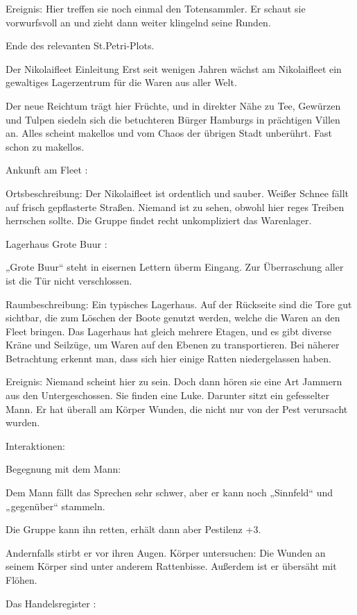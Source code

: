 Ereignis: Hier treffen sie noch einmal den Totensammler. Er schaut sie vorwurfsvoll an und zieht dann weiter klingelnd seine Runden.


Ende des relevanten St.Petri-Plots.

Der Nikolaifleet
Einleitung
Erst seit wenigen Jahren wächst am Nikolaifleet ein gewaltiges Lagerzentrum für die Waren aus aller Welt.

Der neue Reichtum trägt hier Früchte, und in direkter Nähe zu Tee, Gewürzen und Tulpen siedeln sich die betuchteren Bürger Hamburgs in prächtigen Villen an. Alles scheint makellos und vom Chaos der übrigen Stadt unberührt. Fast schon zu makellos.

Ankunft am Fleet
:

Ortsbeschreibung: Der Nikolaifleet ist ordentlich und sauber. Weißer Schnee fällt auf frisch gepflasterte Straßen. Niemand ist zu sehen, obwohl hier reges Treiben herrschen sollte. Die Gruppe findet recht unkompliziert das Warenlager.


Lagerhaus Grote Buur
:

„Grote Buur“ steht in eisernen Lettern überm Eingang. Zur Überraschung aller ist die Tür nicht verschlossen.

Raumbeschreibung: Ein typisches Lagerhaus. Auf der Rückseite sind die Tore gut sichtbar, die zum Löschen der Boote genutzt werden, welche die Waren an den Fleet bringen. Das Lagerhaus hat gleich mehrere Etagen, und es gibt diverse Kräne und Seilzüge, um Waren auf den Ebenen zu transportieren. Bei näherer Betrachtung erkennt man, dass sich hier einige Ratten niedergelassen haben.

Ereignis: Niemand scheint hier zu sein. Doch dann hören sie eine Art Jammern aus den Untergeschossen. Sie finden eine Luke. Darunter sitzt ein gefesselter Mann. Er hat überall am Körper Wunden, die nicht nur von der Pest verursacht wurden.

Interaktionen:

Begegnung mit dem Mann:

Dem Mann fällt das Sprechen sehr schwer, aber er kann noch „Sinnfeld“ und „gegenüber“ stammeln.

Die Gruppe kann ihn retten, erhält dann aber Pestilenz +3.

Andernfalls stirbt er vor ihren Augen.
Körper untersuchen: Die Wunden an seinem Körper sind unter anderem Rattenbisse. Außerdem ist er übersäht mit Flöhen.

Das Handelsregister
:

